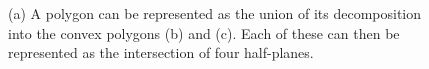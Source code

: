 \begin{figure}[tb]
{\label{subfig:halfspace}}
\caption[A polygon represented as the union of two convex polygons]{(a) A polygon can be represented as the union of its decomposition into the convex polygons (b) and (c). Each of these can then be represented as the intersection of four half-planes.}
\label{fig:halfspace}
\end{figure}

